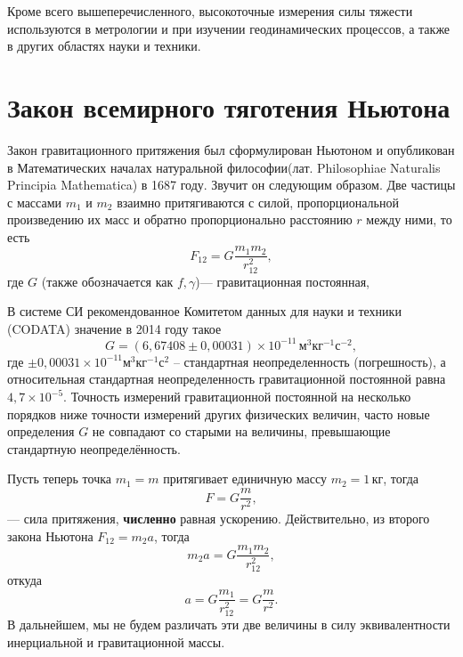 \documentclass[11pt, a4paper]{article}
\theoremstyle{plain}
\theoremstyle{definition}
\theoremstyle{remark}
\begin{document}
Кроме всего вышеперечисленного, высокоточные измерения силы тяжести используются в метрологии и при
изучении геодинамических процессов, а также в других областях науки и техники.

\section{Закон всемирного тяготения Ньютона}
Закон гравитационного притяжения был сформулирован Ньютоном и опубликован в Математических началах
натуральной философии\cite{Newton1687}(лат. Philosophiae Naturalis Principia Mathematica) в 1687
году.
Звучит он следующим образом. Две частицы с массами $m_1$ и $m_2$ взаимно притягиваются с силой,
пропорциональной произведению их масс и обратно пропорционально расстоянию $r$ между ними, то есть
\begin{equation*}
    F_{12} = G\dfrac{m_1m_2}{r_{12}^2},
\end{equation*}
где $G$ (также обозначается как $f,\gamma$)--- гравитационная постоянная, 

В системе СИ рекомендованное Комитетом данных для науки и техники (CODATA) значение в 2014
году\cite{CODATA2014} такое
\begin{equation*}
    G = (6,67408 \pm 0,00031)\times10^{-11}\,\text{м}^3\text{кг}^{-1}\text{с}^{-2},
\end{equation*}
где $\pm0,00031\times10^{-11}\text{м}^3\text{кг}^{-1}\text{с}^2$ -- стандартная неопределенность
(погрешность), а относительная стандартная неопределенность гравитационной постоянной
равна $4,7\times10^{-5}$. Точность измерений гравитационной постоянной на несколько порядков ниже
точности измерений других физических величин,  часто новые определения $G$ не совпадают со старыми
на величины, превышающие стандартную неопределённость.

Пусть теперь точка $m_1 = m$ притягивает единичную массу $m_2 = 1\,\text{кг}$, тогда
\begin{equation}
    F = G\dfrac{m}{r^2},
    \label{eq:dynamic}
\end{equation}
--- сила притяжения, \textbf{численно} равная ускорению.
Действительно, из второго закона Ньютона $F_{12} = m_2 a$, тогда
\begin{equation*}
    m_2 a = G\dfrac{m_1m_2}{r_{12}^2},
\end{equation*}
откуда 
\begin{equation}
    a = G\dfrac{m_1}{r_{12}^2} = G\dfrac{m}{r^2}.
    \label{eq:kinematic}
\end{equation}
В дальнейшем, мы не будем различать эти две величины в силу эквивалентности
инерциальной и гравитационной массы.
\end{document}
